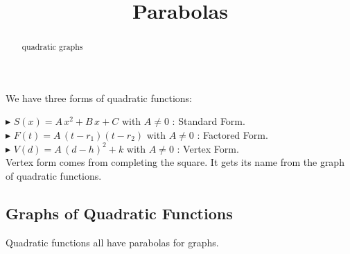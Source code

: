 \documentclass{ximera}
\title{Parabolas}
\begin{document}
\begin{abstract}
quadratic graphs
\end{abstract}
\maketitle





We have three forms of quadratic functions:



$\blacktriangleright$ $S(x) = A \, x^2 + B \, x + C$  with $A \ne 0$ : Standard Form. \\


$\blacktriangleright$ $F(t) = A \, (t - r_1)(t - r_2)$  with $A \ne 0$ : Factored Form. \\


$\blacktriangleright$ $V(d) = A \, (d - h)^2 + k$  with $A \ne 0$ : Vertex Form. \\
Vertex form comes from completing the square.  It gets its name from the graph of quadratic functions.









\subsection{Graphs of Quadratic Functions}



Quadratic functions all have parabolas for graphs.
\end{document}
